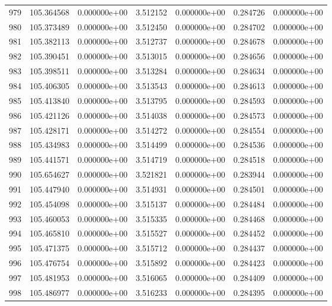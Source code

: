 \begin{tabular}{rrrrrrr}
 979 & 105.364568 &  0.000000e+00 &  3.512152 &  0.000000e+00 &    0.284726 &  0.000000e+00 \\
 980 & 105.373489 &  0.000000e+00 &  3.512450 &  0.000000e+00 &    0.284702 &  0.000000e+00 \\
 981 & 105.382113 &  0.000000e+00 &  3.512737 &  0.000000e+00 &    0.284678 &  0.000000e+00 \\
 982 & 105.390451 &  0.000000e+00 &  3.513015 &  0.000000e+00 &    0.284656 &  0.000000e+00 \\
 983 & 105.398511 &  0.000000e+00 &  3.513284 &  0.000000e+00 &    0.284634 &  0.000000e+00 \\
 984 & 105.406305 &  0.000000e+00 &  3.513543 &  0.000000e+00 &    0.284613 &  0.000000e+00 \\
 985 & 105.413840 &  0.000000e+00 &  3.513795 &  0.000000e+00 &    0.284593 &  0.000000e+00 \\
 986 & 105.421126 &  0.000000e+00 &  3.514038 &  0.000000e+00 &    0.284573 &  0.000000e+00 \\
 987 & 105.428171 &  0.000000e+00 &  3.514272 &  0.000000e+00 &    0.284554 &  0.000000e+00 \\
 988 & 105.434983 &  0.000000e+00 &  3.514499 &  0.000000e+00 &    0.284536 &  0.000000e+00 \\
 989 & 105.441571 &  0.000000e+00 &  3.514719 &  0.000000e+00 &    0.284518 &  0.000000e+00 \\
 990 & 105.654627 &  0.000000e+00 &  3.521821 &  0.000000e+00 &    0.283944 &  0.000000e+00 \\
 991 & 105.447940 &  0.000000e+00 &  3.514931 &  0.000000e+00 &    0.284501 &  0.000000e+00 \\
 992 & 105.454098 &  0.000000e+00 &  3.515137 &  0.000000e+00 &    0.284484 &  0.000000e+00 \\
 993 & 105.460053 &  0.000000e+00 &  3.515335 &  0.000000e+00 &    0.284468 &  0.000000e+00 \\
 994 & 105.465810 &  0.000000e+00 &  3.515527 &  0.000000e+00 &    0.284452 &  0.000000e+00 \\
 995 & 105.471375 &  0.000000e+00 &  3.515712 &  0.000000e+00 &    0.284437 &  0.000000e+00 \\
 996 & 105.476754 &  0.000000e+00 &  3.515892 &  0.000000e+00 &    0.284423 &  0.000000e+00 \\
 997 & 105.481953 &  0.000000e+00 &  3.516065 &  0.000000e+00 &    0.284409 &  0.000000e+00 \\
 998 & 105.486977 &  0.000000e+00 &  3.516233 &  0.000000e+00 &    0.284395 &  0.000000e+00 \\

\end{tabular}
